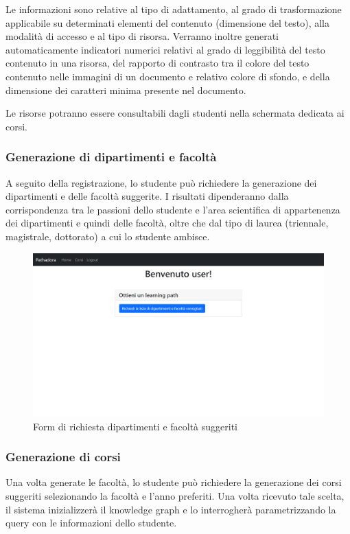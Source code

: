 Le informazioni sono relative al tipo di adattamento, al grado di trasformazione applicabile su determinati elementi del contenuto (dimensione del testo), alla modalità di accesso e al tipo di risorsa. Verranno inoltre generati automaticamente indicatori numerici relativi al grado di leggibilità del testo contenuto in una risorsa, del rapporto di contrasto tra il colore del testo contenuto nelle immagini di un documento e relativo colore di sfondo, e della dimensione dei caratteri minima presente nel documento.

Le risorse potranno essere consultabili dagli studenti nella schermata dedicata ai corsi.

\subsubsection{Generazione di dipartimenti e facoltà}
A seguito della registrazione, lo studente può richiedere la generazione dei dipartimenti e delle facoltà suggerite. I risultati dipenderanno dalla corrispondenza tra le passioni dello studente e l'area scientifica di appartenenza dei dipartimenti e quindi delle facoltà, oltre che dal tipo di laurea (triennale, magistrale, dottorato) a cui lo studente ambisce.

\begin{figure}[H]
\centering
\includegraphics[scale=0.4]{res/faculties-generation.png}
\caption{Form di richiesta dipartimenti e facoltà suggeriti}
\label{fig:faculties-generation}
\end{figure}

\subsubsection{Generazione di corsi}
Una volta generate le facoltà, lo studente può richiedere la generazione dei corsi suggeriti selezionando la facoltà e l'anno preferiti. 
Una volta ricevuto tale scelta, il sistema inizializzerà il knowledge graph e lo interrogherà parametrizzando la query con le informazioni dello studente.

